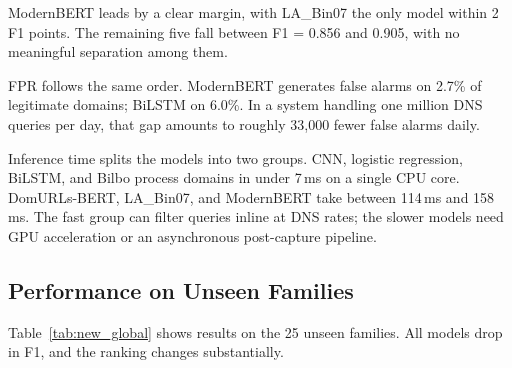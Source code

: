 \documentclass[conference]{IEEEtran}
\begin{document}
ModernBERT leads by a clear margin, with LA\_Bin07 the only model within 2 F1 points. The remaining five fall between F1 = 0.856 and 0.905, with no meaningful separation among them.

FPR follows the same order. ModernBERT generates false alarms on 2.7\% of legitimate domains; BiLSTM on 6.0\%. In a system handling one million DNS queries per day, that gap amounts to roughly 33,000 fewer false alarms daily.

Inference time splits the models into two groups. CNN, logistic regression, BiLSTM, and Bilbo process domains in under 7\,ms on a single CPU core. DomURLs-BERT, LA\_Bin07, and ModernBERT take between 114\,ms and 158\,ms. The fast group can filter queries inline at DNS rates; the slower models need GPU acceleration or an asynchronous post-capture pipeline.

\subsection{Performance on Unseen Families}

Table~\ref{tab:new_global} shows results on the 25 unseen families. All models drop in F1, and the ranking changes substantially.

\begin{table}[!t]
\caption{Average performance on the 25 unseen families (30 runs per family, 50 DGA + 50 legitimate per run). Models sorted by F1. Best value per metric in \textbf{bold}.}
\label{tab:new_global}
\centering
\renewcommand{\arraystretch}{1.1}
\end{table}
\end{document}
